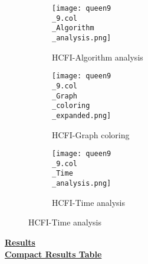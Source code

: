 \documentclass[10pt]{article}
\begin{document}
\graphicspath{{./Core1/Solutions/HCFI/queen9\_9.col}}
\begin{figure}[H]
\begin{subfigure}{.33\textwidth}
  \centering
  \texttt{[image: queen9\\\_9.col\\\_Algorithm\\\_analysis.png]}
  \caption{HCFI-Algorithm analysis}
   \label{fig:subfig1}
\end{subfigure}%
\begin{subfigure}{.33\textwidth}
  \centering
  \texttt{[image: queen9\\\_9.col\\\_Graph\\\_coloring\\\_expanded.png]}
  \caption{HCFI-Graph coloring}
  \label{fig:subfig2}
\end{subfigure}
\begin{subfigure}{.33\textwidth}
  \centering
  \texttt{[image: queen9\\\_9.col\\\_Time\\\_analysis.png]}
  \caption{HCFI-Time analysis}
  \end{subfigure}
\end{figure}
\vspace{2cm}
\begin{center}
\hyperlink{page.8}{\textbf{Results}}\\
\vspace{0.5cm}
\hyperlink{page.71}{\textbf{Compact Results Table}}
\end{center}
\pagebreak
\end{document}
